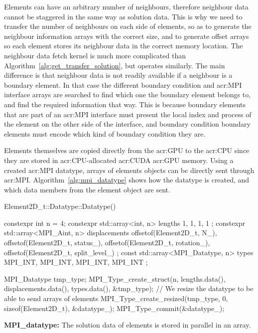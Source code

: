 Elements can have an arbitrary number of neighbours, therefore neighbour data cannot be staggered in
the same way as solution data. This is why we need to transfer the number of neighbours on each side
of elements, so as to generate the neighbour information arrays with the correct size, and to
generate offset arrays so each element stores its neighbour data in the correct memory location. The
neighbour data fetch kernel is much more complicated than Algorithm~\ref{alg:get_transfer_solution},
but operates similarly. The main difference is that neighbour data is not readily available if a
neighbour is a boundary element. In that case the different boundary condition and
\acrshort{acr:MPI} interface arrays are searched to find which one the boundary element belongs to,
and find the required information that way. This is because boundary elements that are part of an
\acrshort{acr:MPI} interface must present the local index and process of the element on the other
side of the interface, and boundary condition boundary elements must encode which kind of boundary
condition they are.

Elements themselves are copied directly from the \acrshort{acr:GPU} to the \acrshort{acr:CPU} since
they are stored in \acrshort{acr:CPU}-allocated \acrshort{acr:CUDA} \acrshort{acr:GPU} memory. Using
a created \acrshort{acr:MPI} datatype, arrays of elements objects can be directly sent through
\acrshort{acr:MPI}. Algorithm~\ref{alg:mpi_datatype} shows how the datatype is created, and which
data members from the element object are sent.

\begin{algorithm}[H]
    \begin{cuda}
        Element2D_t::Datatype::Datatype() {
            constexpr int n = 4;
            constexpr std::array<int, n> lengths {
                1, 
                1, 
                1, 
                1
            };
            constexpr std::array<MPI_Aint, n> displacements {
                offsetof(Element2D_t, N_), 
                offsetof(Element2D_t, status_), 
                offsetof(Element2D_t, rotation_), 
                offsetof(Element2D_t, split_level_)
            };
            const std::array<MPI_Datatype, n> types {
                MPI_INT, 
                MPI_INT, 
                MPI_INT, 
                MPI_INT
            };

            MPI_Datatype tmp_type;
            MPI_Type_create_struct(n, lengths.data(), 
                displacements.data(), types.data(), &tmp_type);
            // We resize the datatype to be able to send arrays of elements
            MPI_Type_create_resized(tmp_type, 0, sizeof(Element2D_t), &datatype_);
            MPI_Type_commit(&datatype_);
        }\end{cuda}
\caption{\textbf{MPI\_datatype:} The solution data of elements is stored in parallel in an array.}\label{alg:mpi_datatype}
\end{algorithm}

